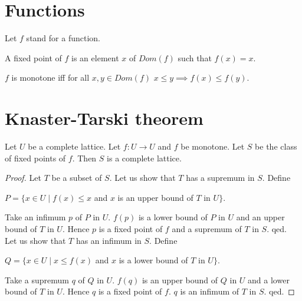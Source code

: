 \documentclass{article}
\begin{document}
  \section{Functions}

  \begin{forthel}

    Let $f$ stand for a function.

    \begin{definition}
      A fixed point of $f$ is an element $x$ of $Dom(f)$ such that $f(x) = x$.
    \end{definition}

    \begin{definition}
      $f$ is monotone iff for all $x,y \in Dom(f)$ $x \leq y \implies f(x) \leq f(y)$.
    \end{definition}
  \end{forthel}

  \section{Knaster-Tarski theorem}

  \begin{forthel}

    \begin{theorem}[KnasterTarski]
      Let $U$ be a complete lattice. Let $f:U \rightarrow U$ and $f$ be monotone.
      Let $S$ be the class of fixed points of $f$. Then $S$ is a complete lattice.
    \end{theorem}
    \begin{proof}
      Let $T$ be a subset of $S$.
      Let us show that $T$ has a supremum in $S$.  Define 
        
        $  P = \{x \in U \mid f(x) \leq x$ and $x$ is an upper bound of $T$ in $U\}$.

        Take an infimum $p$ of $P$ in $U$. $f(p)$ is a lower bound of $P$ in $U$ and an upper bound of $T$ in $U$.
        Hence $p$ is a fixed point of $f$ and a supremum of $T$ in $S$.
      qed. \\
      Let us show that $T$ has an infimum in $S$. Define 
        
        $  Q = \{x \in U \mid x \leq f(x)$ and $x$ is a lower bound of $T$ in $U\}$.

        Take a supremum $q$ of $Q$ in $U$. $f(q)$ is an upper bound of $Q$ in $U$ and a lower bound of $T$ in $U$.
        Hence $q$ is a fixed point of $f$. $q$ is an infimum of $T$ in $S$.
      qed.
    \end{proof}
  \end{forthel}
\end{document}
